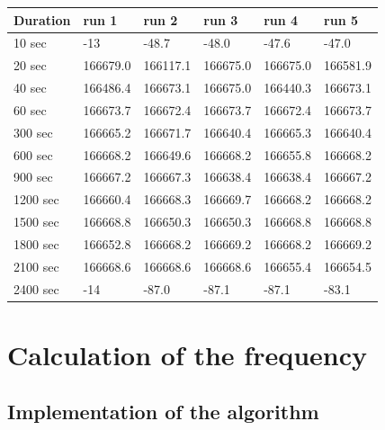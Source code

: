 \documentclass[12pt, a4paper]{report}
\begin{document}
\begin{table}[H]
    \begin{tabular}{|l|l|l|l|l|l|}
    \hline
    Duration & run 1 & run 2 & run 3 & run 4 & run 5 \\ \hline
    10 sec        & -13                 & -48.7     & -48.0     & -47.6      & -47.0      \\ \hline
    20 sec     & 166679.0                 & 166117.1      & 166675.0    & 166675.0      & 166581.9  \\ \hline
    40 sec      & 166486.4                 & 166673.1    & 166675.0     & 166440.3    & 166673.1    \\ \hline
    60 sec      & 166673.7                 & 166672.4	   & 166673.7	  & 166672.4	  & 166673.7  \\ \hline
    300 sec      & 166665.2                 & 166671.7	   & 166640.4	  & 166665.3	  & 166640.4      \\ \hline
    600 sec      & 166668.2                 & 166649.6	   & 166668.2	  & 166655.8	  & 166668.2      \\ \hline
    900 sec      & 166667.2                 & 166667.3	   & 166638.4	  & 166638.4	  & 166667.2      \\ \hline
    1200 sec      & 166660.4                 & 166668.3	   & 166669.7	  & 166668.2	  & 166668.2      \\ \hline
    1500 sec      & 166668.8                 & 166650.3	   & 166650.3	  & 166668.8	  & 166668.8      \\ \hline
    1800 sec      & 166652.8                 & 166668.2	   & 166669.2	  & 166668.2	  & 166669.2      \\ \hline
    2100 sec      & 166668.6                 & 166668.6	   & 166668.6	  & 166655.4	  & 166654.5      \\ \hline
    2400 sec      & -14                 & -87.0	   & -87.1	  & -87.1	  & -83.1      \\ \hline
\end{tabular}
\end{table}

\bigskip
 
\chapter{Calculation of the frequency}

\section{Implementation of the algorithm}
\end{document}
